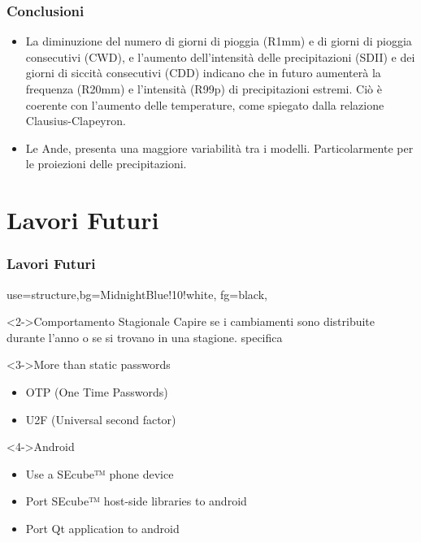 \documentclass[14pt,usenames,dvipsnames]{beamer}
\begin{document}
\begin{frame}	
    \frametitle{Conclusioni}
    \begin{itemize}	
	\item<1-> La diminuzione del numero di giorni di pioggia (R1mm) e di giorni di pioggia consecutivi (CWD), e l'aumento dell'intensità delle precipitazioni (SDII) e dei giorni di siccità consecutivi (CDD) indicano che in futuro aumenterà la frequenza (R20mm) e l'intensità (R99p) di precipitazioni estremi. Ciò è coerente con l'aumento delle temperature, come spiegato dalla relazione Clausius-Clapeyron.
	\item<2-> Le Ande, presenta una maggiore variabilità tra i modelli. Particolarmente per le proiezioni delle precipitazioni.
	
	\end{itemize}
\end{frame}

\section{Lavori Futuri}
\begin{frame}
	\frametitle{Lavori Futuri}
	{
	 {use=structure,bg=MidnightBlue!10!white, fg=black,}
  \fontsize{14pt}{14}\selectfont

	
  \vspace{-0.3cm}	
	  
	\begin{block}<2->{Comportamento Stagionale}
		  Capire se i cambiamenti sono distribuite durante l'anno o se si trovano in una stagione. specifica
		
	\end{block}

	\vspace{-0.1cm}	

	\begin{block}<3->{More than static passwords}
		\begin{itemize}
			\item OTP (One Time Passwords)
			\item U2F (Universal second factor)
		\end{itemize}
	\end{block}
	
	\vspace{-0.1cm}	
	
	\begin{block}<4->{Android}
		\begin{itemize}
			\item Use a SEcube™ phone device
			\item Port SEcube™ host-side libraries to android
			\item Port Qt application to android
		\end{itemize}
	\end{block}	
	}
	
\end{frame}
\end{document}
